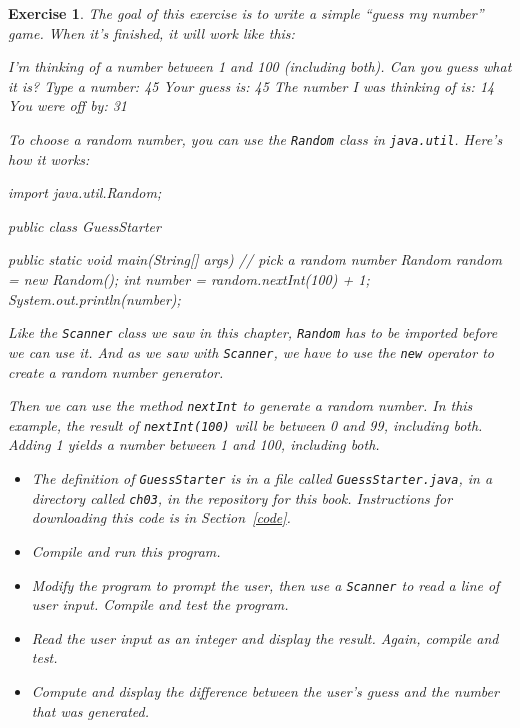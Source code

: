 \documentclass[12pt]{book}
\theoremstyle{exercise}
\newtheorem{exercise}{Exercise}[chapter]
\newcommand{\java}[1]{\verb"#1"}
\newcommand{\java}[1]{\lstinline{#1}} %
\begin{document}
\begin{exercise}
\label{guess}
The goal of this exercise is to write a simple ``guess my number'' game.
When it's finished, it will work like this:

\begin{stdout}
I'm thinking of a number between 1 and 100
(including both). Can you guess what it is?
Type a number: 45
Your guess is: 45
The number I was thinking of is: 14
You were off by: 31
\end{stdout}

To choose a random number, you can use the \java{Random} class in \java{java.util}.
Here's how it works:

\begin{code}
import java.util.Random;

public class GuessStarter {

    public static void main(String[] args) {
        // pick a random number
        Random random = new Random();
        int number = random.nextInt(100) + 1;
        System.out.println(number);
    }
}
\end{code}

Like the \java{Scanner} class we saw in this chapter, \java{Random} has to be imported before we can use it.
And as we saw with \java{Scanner}, we have to use the \java{new} operator to create a random number generator.

Then we can use the method \java{nextInt} to generate a random number.
In this example, the result of \java{nextInt(100)} will be between 0 and 99, including both.
Adding 1 yields a number between 1 and 100, including both.

\begin{itemize}

\item The definition of \java{GuessStarter} is in a file called {\tt GuessStarter.java}, in a directory called {\tt ch03}, in the repository for this book.
Instructions for downloading this code is in Section~\ref{code}.

\item Compile and run this program.

\item Modify the program to prompt the user, then use a \java{Scanner} to read a line of user input.
Compile and test the program.

\item Read the user input as an integer and display the result.
Again, compile and test.

\item Compute and display the difference between the user's guess and the number that was generated.

\end{itemize}

\end{exercise}
\end{document}
